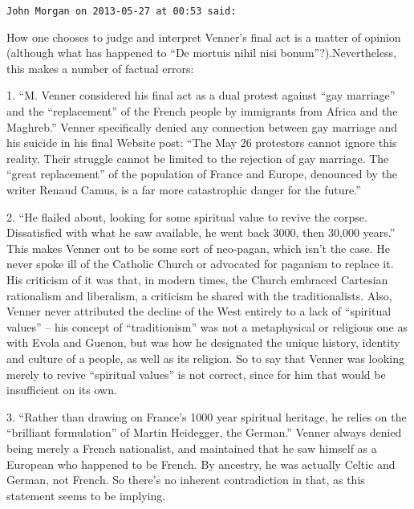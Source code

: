 \begin{footnotesize}
\begin{sffamily}
\texttt{John Morgan on 2013-05-27 at 00:53 said:}

How one chooses to judge and interpret Venner's final act is a matter of opinion (although what has happened to ``De mortuis nihil nisi bonum''?).Nevertheless, this makes a number of factual errors:

1. ``M. Venner considered his final act as a dual protest against ``gay marriage'' and the ``replacement'' of the French people by immigrants from Africa and the Maghreb.'' Venner specifically denied any connection between gay marriage and his suicide in his final Website post: ``The May 26 protestors cannot ignore this reality. Their struggle cannot be limited to the rejection of gay marriage. The ``great replacement'' of the population of France and Europe, denounced by the writer Renaud Camus, is a far more catastrophic danger for the future.''

2. ``He flailed about, looking for some spiritual value to revive the corpse. Dissatisfied with what he saw available, he went back 3000, then 30,000 years.'' This makes Venner out to be some sort of neo-pagan, which isn't the case. He never spoke ill of the Catholic Church or advocated for paganism to replace it. His criticism of it was that, in modern times, the Church embraced Cartesian rationalism and liberalism, a criticism he shared with the traditionalists. Also, Venner never attributed the decline of the West entirely to a lack of ``spiritual values'' -- his concept of ``traditionism'' was not a metaphysical or religious one as with Evola and Guenon, but was how he designated the unique history, identity and culture of a people, as well as its religion. So to say that Venner was looking merely to revive ``spiritual values'' is not correct, since for him that would be insufficient on its own.

3. ``Rather than drawing on France's 1000 year spiritual heritage, he relies on the ``brilliant formulation'' of Martin Heidegger, the German.'' Venner always denied being merely a French nationalist, and maintained that he saw himself as a European who happened to be French. By ancestry, he was actually Celtic and German, not French. So there's no inherent contradiction in that, as this statement seems to be implying.


\end{sffamily}
\end{footnotesize}
